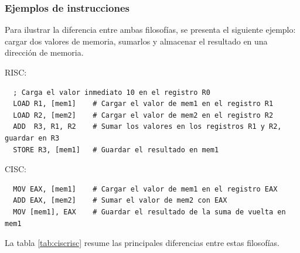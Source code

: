 \documentclass[12pt,oneside]{templates/unerthesis}
\begin{document}
\hypertarget{ejemplos-de-instrucciones}{%
\subsubsection{Ejemplos de instrucciones}\label{ejemplos-de-instrucciones}}

Para ilustrar la diferencia entre ambas filosofías, se presenta el siguiente ejemplo: cargar dos valores de memoria, sumarlos y almacenar el resultado en una dirección de memoria.

RISC:

\begin{lstlisting}
  ; Carga el valor inmediato 10 en el registro R0
  LOAD R1, [mem1]    # Cargar el valor de mem1 en el registro R1
  LOAD R2, [mem2]    # Cargar el valor de mem2 en el registro R2
  ADD  R3, R1, R2    # Sumar los valores en los registros R1 y R2, guardar en R3
  STORE R3, [mem1]   # Guardar el resultado en mem1
  \end{lstlisting}

CISC:

\begin{lstlisting}
  MOV EAX, [mem1]    # Cargar el valor de mem1 en el registro EAX
  ADD EAX, [mem2]    # Sumar el valor de mem2 con EAX
  MOV [mem1], EAX    # Guardar el resultado de la suma de vuelta en mem1
  \end{lstlisting}

La tabla \ref{tab:ciscrisc} resume las principales diferencias entre estas filosofías.
\end{document}
